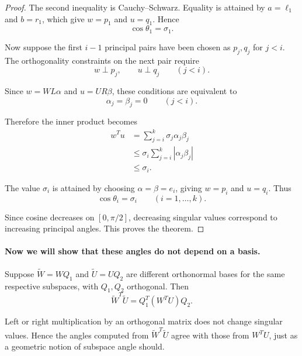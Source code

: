 \documentclass[14pt,letterpaper]{article}
\theoremstyle{plain}
\theoremstyle{definition}
\theoremstyle{remark}
\begin{document}
\begin{proof}
The second inequality is Cauchy--Schwarz. Equality is
attained by $a=\ell_1$ and $b=r_1$, which give
$w=p_1$ and $u=q_1$. Hence
\[
\cos\theta_1=\sigma_1.
\]

Now suppose the first $i-1$ principal pairs have been
chosen as $p_j,q_j$ for $j<i$. The orthogonality
constraints on the next pair require
\[
w\perp p_j,\qquad u\perp q_j\qquad(j<i).
\]

Since $w=WL\alpha$ and $u=UR\beta$, these conditions
are equivalent to
\[
\alpha_j=\beta_j=0\qquad(j<i).
\]

Therefore the inner product becomes
\[
\begin{aligned}
w^Tu
&=\sum_{j=i}^k\sigma_j\alpha_j\beta_j\\
&\leq\sigma_i\sum_{j=i}^k|\alpha_j\beta_j|\\
&\leq\sigma_i.
\end{aligned}
\]

The value $\sigma_i$ is attained by choosing
$\alpha=\beta=e_i$, giving $w=p_i$ and $u=q_i$.
Thus
\[
\cos\theta_i=\sigma_i
\qquad(i=1,\ldots,k).
\]

Since cosine decreases on $[0,\pi/2]$, decreasing
singular values correspond to increasing principal
angles. This proves the theorem.

\end{proof}

\paragraph{Now we will show that these angles do not depend on a basis.}

Suppose $\widetilde W=WQ_1$ and
$\widetilde U=UQ_2$ are different orthonormal bases
for the same respective subspaces, with $Q_1,Q_2$
orthogonal. Then
\[
\widetilde W^T\widetilde U=Q_1^T(W^TU)Q_2.
\]

Left or right multiplication by an orthogonal matrix
does not change singular values. Hence the angles
computed from $\widetilde W^T\widetilde U$ agree with
those from $W^TU$, just as a geometric notion of
subspace angle should.
\end{document}
